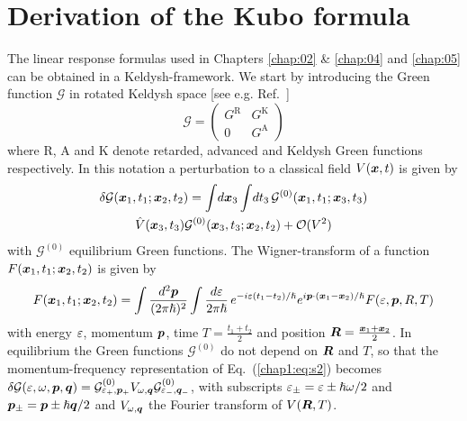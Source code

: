 \chapter{Derivation of the Kubo formula}\label{app:kubo}
The linear response formulas used in Chapters \ref{chap:02} \& \ref{chap:04} and \ref{chap:05} can be obtained in a Keldysh-framework. We start by introducing the Green function $\mathcal{G}$ in rotated Keldysh space [see e.g. Ref.~\cite{rammer_quantum_1986}]
\begin{equation}
    \mathcal{G}=\begin{pmatrix}G^\text{R}&G^\text{K}\\0&G^\text{A}\end{pmatrix}
\end{equation}
where R, A and K denote retarded, advanced and Keldysh Green functions respectively. In this notation a perturbation to a classical field $V(\boldsymbol{x},t)$ is given by
\begin{multline}
    \delta\mathcal{G}(\boldsymbol{x}_1,t_1;\boldsymbol{x}_2,t_2)=\int\!d\boldsymbol{x}_3\int\!dt_3\, \mathcal{G}^{(0)}(\boldsymbol{x}_1,t_1;\boldsymbol{x}_3,t_3)\\\hat{V}(\boldsymbol{x}_3,t_3)\mathcal{G}^{(0)}(\boldsymbol{x}_3,t_3;\boldsymbol{x}_2,t_2)+\mathcal{O}(V^2)
    \label{chap1:eq:s2}
\end{multline}
with $\mathcal{G}^{(0)}$ equilibrium Green functions. The Wigner-transform of a function $F(\boldsymbol{x}_1,t_1;\boldsymbol{x}_2,t_2)$ is given by
  \begin{multline}
    F(\boldsymbol{x}_1,t_1;\boldsymbol{x}_2,t_2)=\int\frac{d^2\boldsymbol{p}}{(2\pi\hslash)^2}\int \frac{d\varepsilon}{2\pi\hslash}\,e^{-i\varepsilon(t_1-t_2)/\hslash}e^{i\boldsymbol{p}\cdot(\boldsymbol{x}_1-\boldsymbol{x}_2)/\hslash}F(\varepsilon,\boldsymbol{p},R,T)
   \end{multline}
with energy $\varepsilon$, momentum $\boldsymbol{p}$, time $T=\frac{t_1+t_2}{2}$ and position $\boldsymbol{R}=\frac{\boldsymbol{x}_1+\boldsymbol{x}_2}{2}$. In equilibrium the Green functions $\mathcal{G}^{(0)}$ do not depend on $\boldsymbol{R}$ and $T$, so that the momentum-frequency representation of Eq.~(\ref{chap1:eq:s2}) becomes 
   $\delta\mathcal{G}(\varepsilon,\omega,\boldsymbol{p},\boldsymbol{q})= \mathcal{G}^{(0)}_{\varepsilon_+,\boldsymbol{p}_+} V_{\omega,\boldsymbol{q}}\mathcal{G}^{{(0)}}_{\varepsilon_-,\boldsymbol{q}_-}$, 
with subscripts $\varepsilon_\pm=\varepsilon\pm\hslash\omega/2$ and $\boldsymbol{p}_\pm=\boldsymbol{p}\pm\hslash\boldsymbol{q}/2$ and $V_{\omega,\boldsymbol{q}}$ the Fourier transform of $V(\boldsymbol{R},T)$. 

